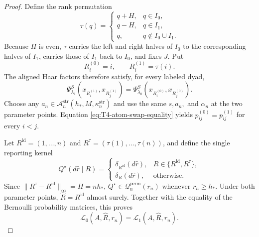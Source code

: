 \documentclass[11pt]{article}
\theoremstyle{definition}
\newcommand{\1}{\mathbf 1}\newcommand{\op}{\operatorname}
\begin{document}
\begin{proof}
Define the rank permutation
\begin{equation}
 \tau(q)=
 \begin{cases}
  q+H,&q\in I_0,\\
  q-H,&q\in I_1,\\
  q,&q\notin I_0\cup I_1.
 \end{cases}
 \label{eq:T4-block-swap}
\end{equation}
Because $H$ is even, $\tau$ carries the left and right halves of
$I_0$ to the corresponding halves of $I_1$, carries those of $I_1$
back to $I_0$, and fixes $J$.  Put
\[
 R_i^{(0)}=i,\qquad R_i^{(1)}=\tau(i).
\]
The aligned Haar factors therefore satisfy, for every labeled dyad,
\begin{equation}
 \Psi_{\lambda_1}^S
   (x_{R_i^{(1)}},x_{R_j^{(1)}})
 =\Psi_{\lambda_0}^S
   (x_{R_i^{(0)}},x_{R_j^{(0)}}).
 \label{eq:T4-atom-swap-equality}
\end{equation}
Choose any
$a_n\in\mathcal A_n^{\mathrm{str}}
(h_*,M,\kappa_n^{\mathrm{str}})$ and use the
same $s,a_n,$ and $\alpha_n$ at the two parameter points.  Equation
\eqref{eq:T4-atom-swap-equality} yields
$p_{ij}^{(0)}=p_{ij}^{(1)}$ for every $i<j$.

Let $R^{\mathrm{id}}=(1,\ldots,n)$ and
$R^\tau=(\tau(1),\ldots,\tau(n))$, and define the single reporting
kernel
\begin{equation}
 Q^\star(d\widehat r\mid R)=
 \begin{cases}
  \delta_{R^{\mathrm{id}}}(d\widehat r),
     &R\in\{R^{\mathrm{id}},R^\tau\},\\
  \delta_R(d\widehat r),&\text{otherwise}.
 \end{cases}
 \label{eq:T4-common-kernel}
\end{equation}
Since
$\|R^\tau-R^{\mathrm{id}}\|_\infty=H=nh_*$,
$Q^\star\in\mathcal Q_n^{\mathrm{perm}}(r_n)$ whenever
$r_n\ge h_*$.  Under both parameter points,
$\widehat R=R^{\mathrm{id}}$ almost surely.  Together with the
equality of the Bernoulli probability matrices, this proves
\begin{equation}
 \mathcal L_0(A,\widehat R,r_n)
 =\mathcal L_1(A,\widehat R,r_n).
 \label{eq:T4-common-observable-law}
\end{equation}


\end{proof}
\end{document}
